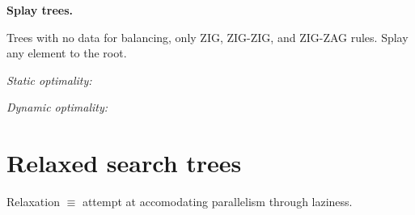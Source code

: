 {\bf Splay trees.}

Trees with no data for balancing, only ZIG, ZIG-ZIG, and ZIG-ZAG rules.
Splay any element to the root.

{\it Static optimality:}

{\it Dynamic optimality:}

\section{Relaxed search trees}

Relaxation $≡$ attempt at accomodating parallelism through laziness.

\bye
